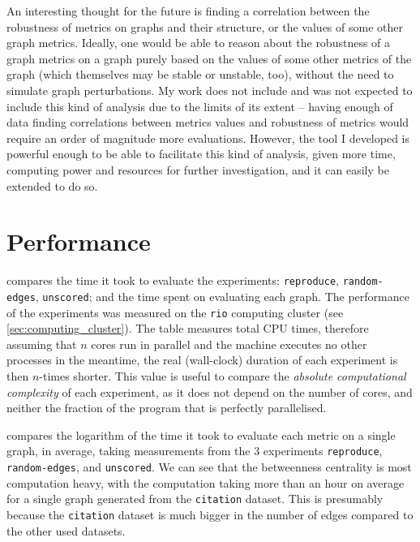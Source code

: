 An interesting thought for the future is finding a correlation between the robustness of metrics on graphs and their structure, or the values of some other graph metrics.
Ideally, one would be able to reason about the robustness of a graph metrics on a graph purely based on the values of some other metrics of the graph (which themselves may be stable or unstable, too), without the need to simulate graph perturbations.
My work does not include and was not expected to include this kind of analysis due to the limits of its extent -- having enough of data finding correlations between metrics values and robustness of metrics would require an order of magnitude more evaluations.
However, the \graffs tool I developed is powerful enough to be able to facilitate this kind of analysis, given more time, computing power and resources for further investigation, and it can easily be extended to do so.


\section{Performance}




 compares the time it took to evaluate the experiments: \texttt{reproduce}, \texttt{random-edges}, \texttt{unscored}; and the time spent on evaluating each graph.
The performance of the experiments was measured on the \texttt{rio} computing cluster (see \autoref{sec:computing_cluster}).
The table measures total CPU times, therefore assuming that $n$ cores run in parallel and the machine executes no other processes in the meantime, the real (wall-clock) duration of each experiment is then $n$-times shorter.
This value is useful to compare the \textsl{absolute computational complexity} of each experiment, as it does not depend on the number of cores, and neither the fraction of the program that is perfectly parallelised.

 compares the logarithm of the time it took to evaluate each metric on a single graph, in average, taking measurements from the 3 experiments \texttt{reproduce}, \texttt{random-edges}, and \texttt{unscored}.
We can see that the betweenness centrality is most computation heavy, with the computation taking more than an hour on average for a single graph generated from the \texttt{citation} dataset.
This is presumably because the \texttt{citation} dataset is much bigger in the number of edges compared to the other used datasets.



